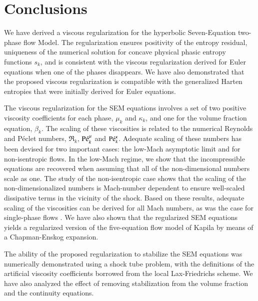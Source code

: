 \documentclass[preprint,10pt]{elsarticle}
\begin{document}
%
\section{Conclusions}\label{sec:conclusion}
%
We have derived a viscous regularization for the hyperbolic Seven-Equation two-phase flow Model. The regularization ensures positivity of the entropy residual, 
uniqueness of the numerical solution for concave physical phasic entropy functions $s_k$, and is consistent with the viscous regularization derived for 
Euler equations when one of the phases disappears. 
We have also demonstrated that the proposed viscous regularization is compatible with the generalized Harten entropies that were initially derived for Euler equations. 

The viscous regularization for the SEM equations involves a set of two positive viscosity coefficients for each phase, $\mu_k$ and $\kappa_k$, and one for the volume 
fraction equation, $\beta_k$. The scaling of these viscosities is related to the numerical Reynolds and P\'eclet numbers, $\Re_k$, $\textrm{P\'e}_k^\mu$ and $\textrm{P\'e}_k^\kappa$. 
Adequate scaling of these numbers has been devised for two important cases: the low-Mach asymptotic limit and for non-isentropic flows. In the low-Mach regime, 
we show that the incompressible equations are recovered when assuming that all of the non-dimensional numbers scale as one. The study of the non-isentropic case 
shows that the scaling of the non-dimensionalized numbers is Mach-number dependent to ensure well-scaled dissipative terms in the vicinity of the shock.
Based on these results, adequate scaling of the viscosities can be derived for all Mach numbers, as was the case for single-phase flows \cite{Marco_paper_low_mach}. 
%
We have also shown that the regularized SEM equations yields a regularized version of the five-equation flow model of Kapila by means of a Chapman-Enskog expansion.

The ability of the proposed regularization to stabilize the SEM equations was numerically demonstrated using a shock tube problem, with the definitions of the 
artificial viscosity coefficients borrowed from the local Lax-Friedrichs scheme. We have also analyzed the effect of removing stabilization from the volume fraction 
and the continuity equations.
\end{document}
